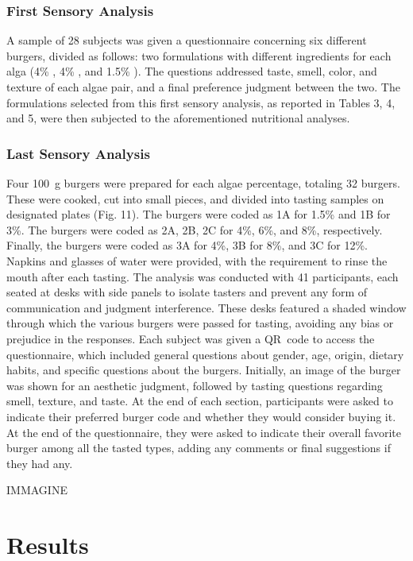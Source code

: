 \subsubsection{First Sensory Analysis}
A sample of 28 subjects was given a questionnaire concerning six different burgers, divided as follows: two formulations with different ingredients for each alga (4\% , 4\% , and 1.5\% ). The questions addressed taste, smell, color, and texture of each algae pair, and a final preference judgment between the two.
The formulations selected from this first sensory analysis, as reported in Tables 3, 4, and 5, were then subjected to the aforementioned nutritional analyses.

\subsubsection{Last Sensory Analysis}
Four \qty{100}{\gram} burgers were prepared for each algae percentage, totaling 32 burgers. These were cooked, cut into small pieces, and divided into tasting samples on designated plates (Fig. 11). The  burgers were coded as 1A for 1.5\% and 1B for 3\%. The  burgers were coded as 2A, 2B, 2C for 4\%, 6\%, and 8\%, respectively. Finally, the  burgers were coded as 3A for 4\%, 3B for 8\%, and 3C for 12\%.
Napkins and glasses of water were provided, with the requirement to rinse the mouth after each tasting. The analysis was conducted with 41 participants, each seated at desks with side panels to isolate tasters and prevent any form of communication and judgment interference. These desks featured a shaded window through which the various burgers were passed for tasting, avoiding any bias or prejudice in the responses. Each subject was given a QR~code to access the questionnaire, which included general questions about gender, age, origin, dietary habits, and specific questions about the burgers. Initially, an image of the burger was shown for an aesthetic judgment, followed by tasting questions regarding smell, texture, and taste. At the end of each section, participants were asked to indicate their preferred burger code and whether they would consider buying it. At the end of the questionnaire, they were asked to indicate their overall favorite burger among all the tasted types, adding any comments or final suggestions if they had any.

IMMAGINE

\section{Results}
